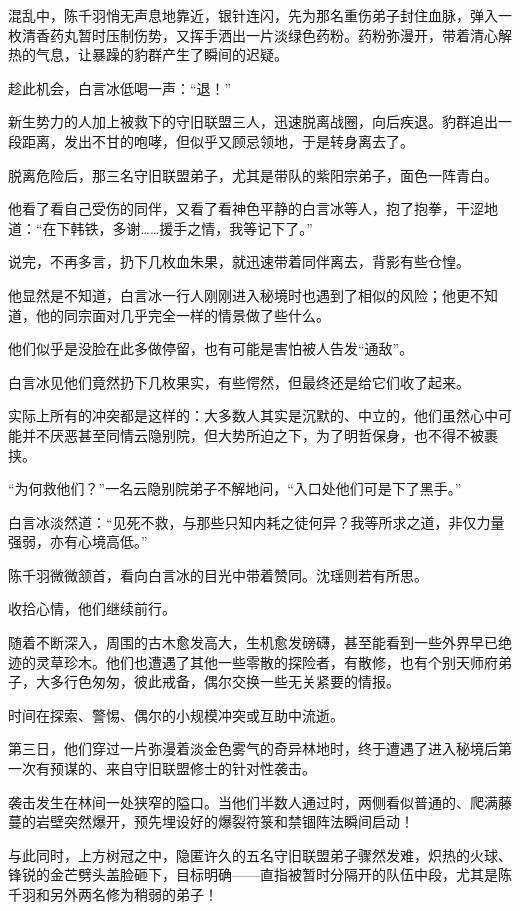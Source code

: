 混乱中，陈千羽悄无声息地靠近，银针连闪，先为那名重伤弟子封住血脉，弹入一枚清香药丸暂时压制伤势，又挥手洒出一片淡绿色药粉。药粉弥漫开，带着清心解热的气息，让暴躁的豹群产生了瞬间的迟疑。

趁此机会，白言冰低喝一声：“退！”

新生势力的人加上被救下的守旧联盟三人，迅速脱离战圈，向后疾退。豹群追出一段距离，发出不甘的咆哮，但似乎又顾忌领地，于是转身离去了。

脱离危险后，那三名守旧联盟弟子，尤其是带队的紫阳宗弟子，面色一阵青白。

他看了看自己受伤的同伴，又看了看神色平静的白言冰等人，抱了抱拳，干涩地道：“在下韩铁，多谢……援手之情，我等记下了。”

说完，不再多言，扔下几枚血朱果，就迅速带着同伴离去，背影有些仓惶。

他显然是不知道，白言冰一行人刚刚进入秘境时也遇到了相似的风险；他更不知道，他的同宗面对几乎完全一样的情景做了些什么。

他们似乎是没脸在此多做停留，也有可能是害怕被人告发“通敌”。

白言冰见他们竟然扔下几枚果实，有些愕然，但最终还是给它们收了起来。

实际上所有的冲突都是这样的：大多数人其实是沉默的、中立的，他们虽然心中可能并不厌恶甚至同情云隐别院，但大势所迫之下，为了明哲保身，也不得不被裹挟。

“为何救他们？”一名云隐别院弟子不解地问，“入口处他们可是下了黑手。”

白言冰淡然道：“见死不救，与那些只知内耗之徒何异？我等所求之道，非仅力量强弱，亦有心境高低。”

陈千羽微微颔首，看向白言冰的目光中带着赞同。沈瑶则若有所思。

\vspace{2em}

收拾心情，他们继续前行。

随着不断深入，周围的古木愈发高大，生机愈发磅礴，甚至能看到一些外界早已绝迹的灵草珍木。他们也遭遇了其他一些零散的探险者，有散修，也有个别天师府弟子，大多行色匆匆，彼此戒备，偶尔交换一些无关紧要的情报。

时间在探索、警惕、偶尔的小规模冲突或互助中流逝。

第三日，他们穿过一片弥漫着淡金色雾气的奇异林地时，终于遭遇了进入秘境后第一次有预谋的、来自守旧联盟修士的针对性袭击。

袭击发生在林间一处狭窄的隘口。当他们半数人通过时，两侧看似普通的、爬满藤蔓的岩壁突然爆开，预先埋设好的爆裂符箓和禁锢阵法瞬间启动！

与此同时，上方树冠之中，隐匿许久的五名守旧联盟弟子骤然发难，炽热的火球、锋锐的金芒劈头盖脸砸下，目标明确——直指被暂时分隔开的队伍中段，尤其是陈千羽和另外两名修为稍弱的弟子！

